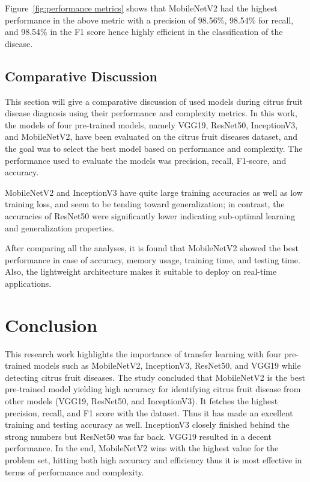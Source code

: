 \documentclass{ijcaArticle}
\begin{document}
Figure~\ref{fig:performance metrics} shows that MobileNetV2 had the highest performance in the above metric with a precision of 98.56\%, 98.54\% for recall, and 98.54\% in the F1 score hence highly efficient in the classification of the disease.

\subsection{Comparative Discussion}
This section will give a comparative discussion of used models during citrus fruit disease diagnosis using their performance and complexity metrics. In this work, the models of four pre-trained models, namely VGG19, ResNet50, InceptionV3, and MobileNetV2, have been evaluated on the citrus fruit diseases dataset, and the goal was to select the best model based on performance and complexity. The performance used to evaluate the models was precision, recall, F1-score, and accuracy.

MobileNetV2 and InceptionV3 have quite large training accuracies as well as low training loss, and seem to be tending toward generalization; in contrast, the accuracies of ResNet50 were significantly lower indicating sub-optimal learning and generalization properties.

After comparing all the analyses, it is found that MobileNetV2 showed the best performance in case of accuracy, memory usage, training time, and testing time. Also, the lightweight architecture makes it suitable to deploy on real-time applications.

\section{Conclusion}
\label{sec:conclusion}

This research work highlights the importance of transfer learning with four pre-trained models such as MobileNetV2, InceptionV3, ResNet50, and VGG19 while detecting citrus fruit diseases. The study concluded that MobileNetV2 is the best pre-trained model yielding high accuracy for identifying citrus fruit disease from other models (VGG19, ResNet50, and InceptionV3). It fetches the highest precision, recall, and F1 score with the dataset. Thus it has made an excellent training and testing accuracy as well. InceptionV3 closely finished behind the strong numbers but ResNet50 was far back. VGG19 resulted in a decent performance. In the end, MobileNetV2 wins with the highest value for the problem set, hitting both high accuracy and efficiency thus it is most effective in terms of performance and complexity.
\end{document}
